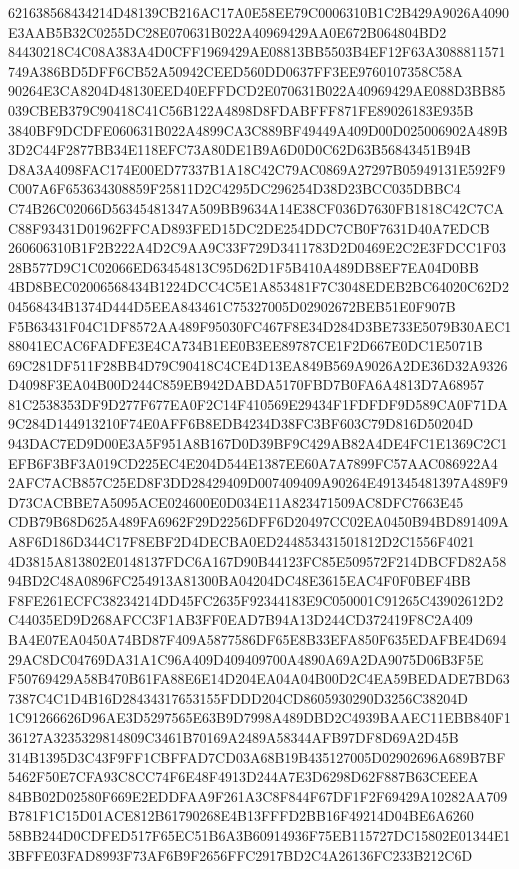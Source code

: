 \documentclass[UTF8,fontset=fandol,zihao=-4,a4paper]{ctexart}
\begin{document}
{{621638568434214D48139CB216AC17A0E58EE79C0006310B1C2B429A9026A4090E3AAB5B32C0255DC28E070631B022A40969429AA0E672B064804BD2
84430218C4C08A383A4D0CFF1969429AE08813BB5503B4EF12F63A3088811571749A386BD5DFF6CB52A50942CEED560DD0637FF3EE9760107358C58A
90264E3CA8204D48130EED40EFFDCD2E070631B022A40969429AE088D3BB85039CBEB379C90418C41C56B122A4898D8FDABFFF871FE89026183E935B
3840BF9DCDFE060631B022A4899CA3C889BF49449A409D00D025006902A489B3D2C44F2877BB34E118EFC73A80DE1B9A6D0D0C62D63B56843451B94B
D8A3A4098FAC174E00ED77337B1A18C42C79AC0869A27297B05949131E592F9C007A6F653634308859F25811D2C4295DC296254D38D23BCC035DBBC4
C74B26C02066D56345481347A509BB9634A14E38CF036D7630FB1818C42C7CAC88F93431D01962FFCAD893FED15DC2DE254DDC7CB0F7631D40A7EDCB
260606310B1F2B222A4D2C9AA9C33F729D3411783D2D0469E2C2E3FDCC1F0328B577D9C1C02066ED63454813C95D62D1F5B410A489DB8EF7EA04D0BB
4BD8BEC02006568434B1224DCC4C5E1A853481F7C3048EDEB2BC64020C62D204568434B1374D444D5EEA843461C75327005D02902672BEB51E0F907B
F5B63431F04C1DF8572AA489F95030FC467F8E34D284D3BE733E5079B30AEC188041ECAC6FADFE3E4CA734B1EE0B3EE89787CE1F2D667E0DC1E5071B
69C281DF511F28BB4D79C90418C4CE4D13EA849B569A9026A2DE36D32A9326D4098F3EA04B00D244C859EB942DABDA5170FBD7B0FA6A4813D7A68957
81C2538353DF9D277F677EA0F2C14F410569E29434F1FDFDF9D589CA0F71DA9C284D144913210F74E0AFF6B8EDB4234D38FC3BF603C79D816D50204D
943DAC7ED9D00E3A5F951A8B167D0D39BF9C429AB82A4DE4FC1E1369C2C1EFB6F3BF3A019CD225EC4E204D544E1387EE60A7A7899FC57AAC086922A4
2AFC7ACB857C25ED8F3DD28429409D007409409A90264E491345481397A489F9D73CACBBE7A5095ACE024600E0D034E11A823471509AC8DFC7663E45
CDB79B68D625A489FA6962F29D2256DFF6D20497CC02EA0450B94BD891409AA8F6D186D344C17F8EBF2D4DECBA0ED244853431501812D2C1556F4021
4D3815A813802E0148137FDC6A167D90B44123FC85E509572F214DBCFD82A5894BD2C48A0896FC254913A81300BA04204DC48E3615EAC4F0F0BEF4BB
F8FE261ECFC38234214DD45FC2635F92344183E9C050001C91265C43902612D2C44035ED9D268AFCC3F1AB3FF0EAD7B94A13D244CD372419F8C2A409
BA4E07EA0450A74BD87F409A5877586DF65E8B33EFA850F635EDAFBE4D69429AC8DC04769DA31A1C96A409D409409700A4890A69A2DA9075D06B3F5E
F50769429A58B470B61FA88E6E14D204EA04A04B00D2C4EA59BEDADE7BD637387C4C1D4B16D28434317653155FDDD204CD8605930290D3256C38204D
1C91266626D96AE3D5297565E63B9D7998A489DBD2C4939BAAEC11EBB840F136127A3235329814809C3461B70169A2489A58344AFB97DF8D69A2D45B
314B1395D3C43F9FF1CBFFAD7CD03A68B19B435127005D02902696A689B7BF5462F50E7CFA93C8CC74F6E48F4913D244A7E3D6298D62F887B63CEEEA
84BB02D02580F669E2EDDFAA9F261A3C8F844F67DF1F2F69429A10282AA709B781F1C15D01ACE812B61790268E4B13FFFD2BB16F49214D04BE6A6260
58BB244D0CDFED517F65EC51B6A3B60914936F75EB115727DC15802E01344E13BFFE03FAD8993F73AF6B9F2656FFC2917BD2C4A26136FC233B212C6D
}}
\end{document}
